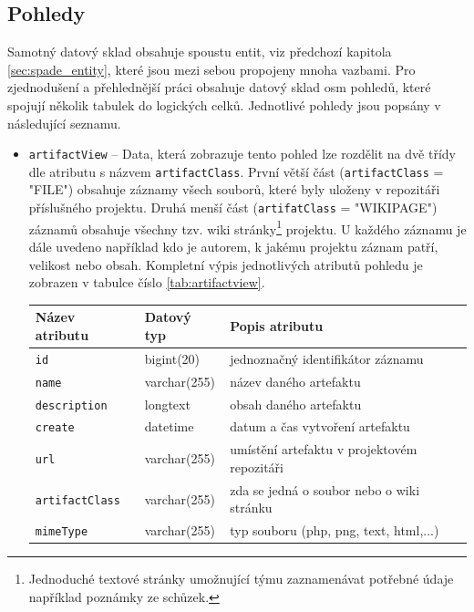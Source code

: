 \documentclass[czech,DP]{thesiskiv}
\begin{document}
\subsection{Pohledy}
Samotný datový sklad obsahuje spoustu entit, viz předchozí kapitola \ref{sec:spade_entity}, které jsou mezi sebou propojeny mnoha vazbami. Pro zjednodušení a přehlednější práci obsahuje datový sklad osm pohledů, které spojují několik tabulek do logických celků. Jednotlivé pohledy jsou popsány v následující seznamu.
\begin{itemize}
    \item \texttt{artifactView} -- Data, která zobrazuje tento pohled lze rozdělit na dvě třídy dle atributu s názvem \texttt{artifactClass}. První větší část (\texttt{artifactClass} = "FILE") obsahuje záznamy všech souborů, které byly uloženy v repozitáři příslušného projektu. Druhá menší část (\texttt{artifatClass} = "WIKIPAGE") záznamů obsahuje všechny tzv. wiki stránky\footnote{Jednoduché textové stránky umožnující týmu zaznamenávat potřebné údaje například poznámky ze schůzek.} projektu. U každého záznamu je dále uvedeno například kdo je autorem, k jakému projektu záznam patří, velikost nebo obsah. Kompletní výpis jednotlivých atributů pohledu je zobrazen v tabulce číslo \ref{tab:artifactview}.
    \begin{table}[]
        \begin{tabular}{|l|l|l|}
        \hline
        \textbf{Název atributu} & \textbf{Datový typ} & \textbf{Popis atributu}                              \\ \hline \hline
        \texttt{id}             & bigint(20)          & jednoznačný identifikátor záznamu           \\ \hline
        \texttt{name}           & varchar(255)        & název daného artefaktu                      \\ \hline
        \texttt{description}    & longtext            & obsah daného artefaktu                      \\ \hline
        \texttt{create}         & datetime            & datum a čas vytvoření artefaktu             \\ \hline
        \texttt{url}            & varchar(255)        & umístění artefaktu v projektovém repozitáři \\ \hline
        \texttt{artifactClass}  & varchar(255)        & zda se jedná o soubor nebo o wiki stránku   \\ \hline
        \texttt{mimeType}       & varchar(255)        & typ souboru (php, png, text, html,...)      \\ \hline

\end{tabular}
\end{table}
\end{itemize}
\end{document}
